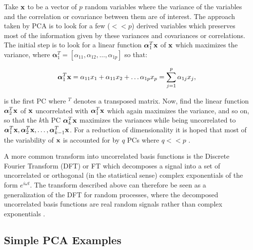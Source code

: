 Take $\textrm{\textbf{x}}$ to be a vector of $p$ random variables where the variance of the variables and the correlation or covariance between them are of interest. The approach taken by PCA is to look for a few ($<<p$) derived variables which preserves most of the information given by these variances and covariances or correlations. The initial step is to look for a linear function $\boldsymbol\alpha_1^T \textrm{\textbf{x}}$ of $\textrm{\textbf{x}}$ which maximizes the variance, where $\boldsymbol\alpha_1^T =  [\alpha_{1{}1},\alpha_{1{}2},\ldots,\alpha_{1{}p}]$ so that:

\begin{equation}\label{eq:PCAdef}
\boldsymbol\alpha_1^T \textrm{\textbf{x}}= \alpha_{1{}1}x_1 +\alpha_{1{}1} x_2 + \ldots \alpha_{1{}p} x_p = \sum^p_{j=1}\alpha_{1{}j}x_j,
\end{equation}

is the first PC where ${}^T$ denotes a transposed matrix.
Now, find the linear function $\boldsymbol\alpha_2^T \textrm{\textbf{x}}$ of $\textrm{\textbf{x}}$ uncorrelated with $\boldsymbol\alpha_1^T \textrm{\textbf{x}}$ which again maximizes the variance, and so on, so that the $k$th PC $\boldsymbol\alpha_k^T \textrm{\textbf{x}}$ maximizes the variances while being uncorrelated to $\boldsymbol\alpha_1^T \textrm{\textbf{x}}, \boldsymbol\alpha_2^T \textrm{\textbf{x}}, \ldots, \boldsymbol\alpha_{k-1}^T \textrm{\textbf{x}}$. For a reduction of dimensionality it is hoped that most of the variability of $\textrm{\textbf{x}}$ is accounted for by $q$ PCs where $q<<p$ \citep[chap. 1]{Jolliffe1986}.

A more common transform into uncorrelated basis functions is the Discrete Fourier Transform (DFT) or FT which decomposes a signal into a set of uncorrelated or orthogonal (in the statistical sense) complex exponentials of the form $e^{i\omega t}$. The transform described above can therefore be seen as a generalization of the DFT for random processes, where the decomposed uncorrelated basis functions are real random signals rather than complex exponentials \citep[chap. 4.6]{Therrien1992}.

\subsection{Simple PCA Examples}

